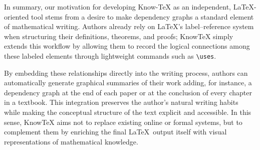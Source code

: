\documentclass{article}
\begin{document}
In  summary, our motivation for developing Know-TeX as an independent, \LaTeX-oriented tool stems from a desire to make dependency graphs a standard element of mathematical writing. Authors already rely on \LaTeX’s label–reference system when structuring their definitions, theorems, and proofs; KnowTeX simply extends this workflow by allowing
them to record the logical connections among these labeled elements through lightweight commands such as {\verb|\uses|}. 

By embedding these relationships directly into the writing process, authors can automatically generate graphical summaries of their work adding, for instance, a dependency graph at the end of each paper or at the conclusion of every chapter in a textbook. 
This integration preserves the author’s natural writing habits while making the conceptual structure of the text explicit and accessible. 
In this sense, KnowTeX aims not to replace existing online or formal systems, but to complement them by enriching the final \LaTeX\ output itself with visual representations of mathematical knowledge.



\end{document}
